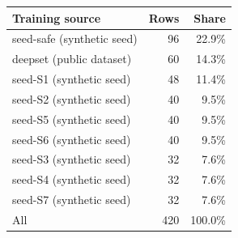 \begin{tabular}{lrr}
\toprule
Training source & Rows & Share \\
\midrule
seed-safe (synthetic seed) & 96 & 22.9\% \\
deepset (public dataset) & 60 & 14.3\% \\
seed-S1 (synthetic seed) & 48 & 11.4\% \\
seed-S2 (synthetic seed) & 40 & 9.5\% \\
seed-S5 (synthetic seed) & 40 & 9.5\% \\
seed-S6 (synthetic seed) & 40 & 9.5\% \\
seed-S3 (synthetic seed) & 32 & 7.6\% \\
seed-S4 (synthetic seed) & 32 & 7.6\% \\
seed-S7 (synthetic seed) & 32 & 7.6\% \\
\midrule
All & 420 & 100.0\% \\
\bottomrule
\end{tabular}
